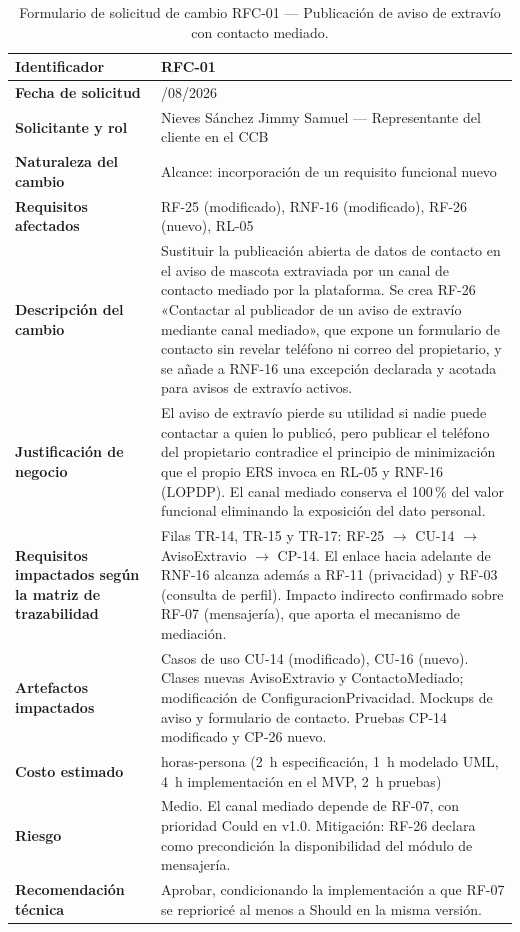 \documentclass[journal,onecolumn]{IEEEtran}
\begin{document}
	\label{tab:rfc-01}
	\begin{longtable}{
			|>{\raggedright\arraybackslash}p{3.8cm}
			|>{\raggedright\arraybackslash}p{9.7cm}|
		}
		\caption{Formulario de solicitud de cambio RFC-01 — Publicación de
			aviso de extravío con contacto mediado.} \\
		\hline
		\textbf{Identificador} & RFC-01 \\
		\hline
		\textbf{Fecha de solicitud} & 09/08/2026 \\
		\hline
		\textbf{Solicitante y rol} & Nieves Sánchez Jimmy Samuel —
		Representante del cliente en el CCB \\
		\hline
		\textbf{Naturaleza del cambio} & Alcance: incorporación de un
		requisito funcional nuevo \\
		\hline
		\textbf{Requisitos afectados} & RF-25 (modificado), RNF-16
		(modificado), RF-26 (nuevo), RL-05 \\
		\hline
		\textbf{Descripción del cambio} & Sustituir la publicación abierta
		de datos de contacto en el aviso de mascota extraviada por un canal
		de contacto mediado por la plataforma. Se crea RF-26 «Contactar al
		publicador de un aviso de extravío mediante canal mediado», que
		expone un formulario de contacto sin revelar teléfono ni correo del
		propietario, y se añade a RNF-16 una excepción declarada y acotada
		para avisos de extravío activos. \\
		\hline
		\textbf{Justificación de negocio} & El aviso de extravío pierde su
		utilidad si nadie puede contactar a quien lo publicó, pero publicar
		el teléfono del propietario contradice el principio de
		minimización que el propio ERS invoca en RL-05 y RNF-16 (LOPDP).
		El canal mediado conserva el 100\,\% del valor funcional eliminando
		la exposición del dato personal. \\
		\hline
		\textbf{Requisitos impactados según la matriz de trazabilidad} &
		Filas TR-14, TR-15 y TR-17: RF-25 $\rightarrow$ CU-14
		$\rightarrow$ AvisoExtravio $\rightarrow$ CP-14. El enlace hacia
		adelante de RNF-16 alcanza además a RF-11 (privacidad) y RF-03
		(consulta de perfil). Impacto indirecto confirmado sobre RF-07
		(mensajería), que aporta el mecanismo de mediación. \\
		\hline
		\textbf{Artefactos impactados} & Casos de uso CU-14 (modificado),
		CU-16 (nuevo). Clases nuevas AvisoExtravio y ContactoMediado;
		modificación de ConfiguracionPrivacidad. Mockups de aviso y
		formulario de contacto. Pruebas CP-14 modificado y CP-26 nuevo. \\
		\hline
		\textbf{Costo estimado} & 9 horas-persona (2~h especificación, 1~h
		modelado UML, 4~h implementación en el MVP, 2~h pruebas) \\
		\hline
		\textbf{Riesgo} & Medio. El canal mediado depende de RF-07, con
		prioridad Could en v1.0. Mitigación: RF-26 declara como
		precondición la disponibilidad del módulo de mensajería. \\
		\hline
		\textbf{Recomendación técnica} & Aprobar, condicionando la
		implementación a que RF-07 se reprioricé al menos a Should en la
		misma versión. \\
		\hline
	\end{longtable}
	
\end{document}
